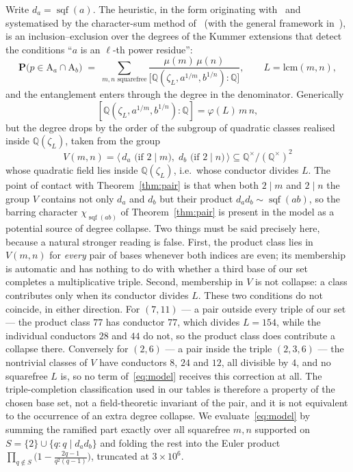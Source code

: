 \documentclass[11pt,reqno]{amsart}
\theoremstyle{plain}
\theoremstyle{definition}
\DeclareMathOperator{\sqf}{sqf}
\newcommand{\Art}{\mathrm{A}}
\newcommand{\Q}{\mathbb{Q}}
\begin{document}
Write $d_a = \sqf(a)$. The heuristic, in the form originating
with~\cite{Matthews1976} and systematised by the character-sum method
of~\cite{MoreeStevenhagen2014} (with the general framework
in~\cite{JarviniemiPeruccaSgobba2025}), is an inclusion--exclusion over the
degrees of the Kummer extensions that detect the conditions ``$a$ is an
$\ell$-th power residue'':
\begin{equation}
\label{eq:model}
  \mathbf{P}\bigl(p \in \Art_a \cap \Art_b\bigr)
  \;=\; \sum_{m, n \text{ squarefree}}
  \frac{\mu(m)\,\mu(n)}
       {\bigl[\Q(\zeta_L, a^{1/m}, b^{1/n}) : \Q\bigr]},
  \qquad L = \mathrm{lcm}(m,n),
\end{equation}
and the entanglement enters through the degree in the denominator. Generically
\[
  [\Q(\zeta_L, a^{1/m}, b^{1/n}):\Q] = \varphi(L)\,m\,n ,
\]
but the degree drops by the order of the subgroup of quadratic classes
realised inside $\Q(\zeta_L)$, taken from the group
\[
  V(m,n) = \bigl\langle\, d_a \text{ (if $2 \mid m$)},\;
                          d_b \text{ (if $2 \mid n$)} \,\bigr\rangle
  \subseteq \Q^\times/(\Q^\times)^2
\]
whose quadratic field lies inside $\Q(\zeta_L)$, i.e.\ whose conductor divides
$L$. The point of contact with Theorem~\ref{thm:pair} is that when both
$2 \mid m$ and $2 \mid n$ the group $V$ contains not only $d_a$ and $d_b$ but
their product $d_a d_b \sim \sqf(ab)$, so the barring character
$\chi_{\sqf(ab)}$ of Theorem~\ref{thm:pair} is present in the model as a
potential source of degree collapse. Two things must be said precisely here,
because a natural stronger reading is false. First, the product class lies in
$V(m,n)$ for \emph{every} pair of bases whenever both indices are even; its
membership is automatic and has nothing to do with whether a third base of our
set completes a multiplicative triple. Second, membership in $V$ is not
collapse: a class contributes only when its conductor divides $L$. These two
conditions do not coincide, in either direction. For $(7,11)$ --- a pair
outside every triple of our set --- the product class $77$ has conductor $77$,
which divides $L = 154$, while the individual conductors $28$ and $44$ do not,
so the product class does contribute a collapse there. Conversely for $(2,6)$
--- a pair inside the triple $(2,3,6)$ --- the nontrivial classes of $V$ have
conductors $8$, $24$ and $12$, all divisible by $4$, and no squarefree $L$ is,
so no term of~\eqref{eq:model} receives this correction at all. The
triple-completion classification used in our tables is therefore a property of
the chosen base set, not a field-theoretic invariant of the pair, and it is not
equivalent to the occurrence of an extra degree collapse. We evaluate~\eqref{eq:model}
by summing the ramified part exactly over all squarefree $m, n$ supported on
$S = \{2\} \cup \{q : q \mid d_a d_b\}$ and folding the rest into the Euler
product $\prod_{q \notin S}\bigl(1 - \tfrac{2q-1}{q^2(q-1)}\bigr)$,
truncated at $3 \times 10^6$.
\end{document}
